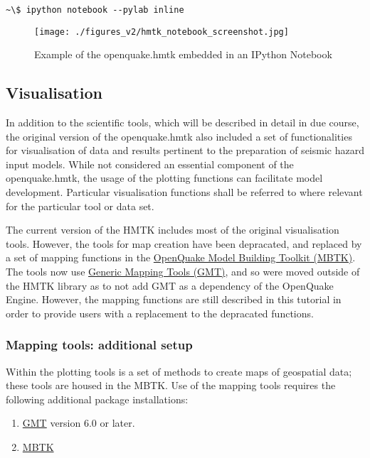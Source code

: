 \begin{Verbatim}[frame=single, commandchars=\\\{\}, fontsize=\scriptsize]
~\$ ipython notebook --pylab inline
\end{Verbatim}

\begin{figure}[htb]
  \centering
      \texttt{[image: ./figures\_v2/hmtk\_notebook\_screenshot.jpg]}
  \caption{Example of the openquake.hmtk embedded in an IPython Notebook}
  \label{fig:notebook}
\end{figure}


\subsection{Visualisation}

In addition to the scientific tools, which will be described in detail in due course, the original version of the openquake.hmtk also included a set of functionalities for visualisation of data and results pertinent to the preparation of seismic hazard input models. While not considered an essential component of the openquake.hmtk, the usage of the plotting functions can facilitate model development. Particular visualisation functions shall be referred to where relevant for the particular tool or data set. 

The current version of the HMTK includes most of the original visualisation tools. However, the tools for map creation have been depracated, and replaced by a set of mapping functions in the \href{https://github.com/GEMScienceTools/oq-mbtk/tree/master/openquake}{OpenQuake Model Building Toolkit (MBTK)}. The tools now use \href{https://www.generic-mapping-tools.org}{Generic Mapping Tools (GMT)}, and so were moved outside of the HMTK library as to not add GMT as a dependency of the OpenQuake Engine. However, the mapping functions are still described in this tutorial in order to provide users with a replacement to the depracated functions. 

\subsubsection{Mapping tools: additional setup}
Within the plotting tools is a set of methods to create maps of geospatial data; these tools are housed in the MBTK. Use of the mapping tools requires the following additional package installations:\\

\begin{enumerate}
	\item \href{https://www.generic-mapping-tools.org/download/}{GMT} version 6.0 or later.
	\item \href{https://github.com/GEMScienceTools/oq-mbtk/tree/master/openquake}{MBTK}\\
\end{enumerate}

